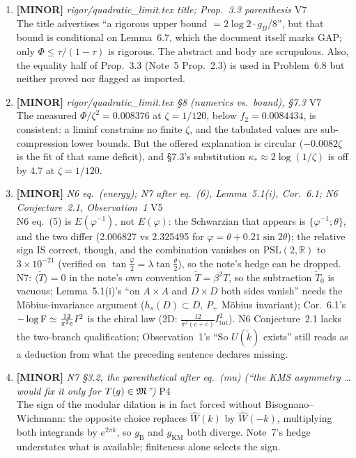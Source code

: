 \documentclass[11pt]{article}
\begin{document}
\begin{enumerate}[leftmargin=1.6em,itemsep=6pt]
\item \textbf{[MINOR]} \emph{rigor/quadratic\_limit.tex title; Prop.~3.3 parenthesis} \hfill\textsc{V7}\\ The title advertises ``a rigorous upper bound \(=2\log2\cdot g_B/8\)'', but that bound is conditional on Lemma~6.7, which the document itself marks GAP; only \(\Phi\le\tau/(1-\tau)\) is rigorous. The abstract and body are scrupulous. Also, the equality half of Prop.~3.3 (Note~5 Prop.~2.3) is used in Problem~6.8 but neither proved nor flagged as imported.
\item \textbf{[MINOR]} \emph{rigor/quadratic\_limit.tex \S8 (numerics vs.\ bound), \S7.3} \hfill\textsc{V7}\\ The measured \(\Phi/\zeta^2=0.008376\) at \(\zeta=1/120\), below \(f_2=0.0084434\), is consistent: a liminf constrains no finite \(\zeta\), and the tabulated values are sub-compression lower bounds. But the offered explanation is circular (\(-0.0082\zeta\) is the fit of that same deficit), and \S7.3's substitution \(\kappa_*\approx2\log(1/\zeta)\) is off by \(4.7\) at \(\zeta=1/120\).
\item \textbf{[MINOR]} \emph{N6 eq.\ (energy); N7 after eq.\ (6), Lemma~5.1(i), Cor.\ 6.1; N6 Conjecture~2.1, Observation~1} \hfill\textsc{V5}\\ N6 eq.\ (5) is \(E(\varphi^{-1})\), not \(E(\varphi)\): the Schwarzian that appears is \(\{\varphi^{-1};\theta\}\), and the two differ (2.006827 vs 2.325495 for \(\varphi=\theta+0.21\sin2\theta\)); the relative sign IS correct, though, and the combination vanishes on \(\mathrm{PSL}(2,\mathbb R)\) to \(3\times10^{-21}\) (verified on \(\tan\frac\varphi2=\lambda\tan\frac\theta2\)), so the note's hedge can be dropped. N7: \(\langle\widetilde T\rangle=0\) in the note's own convention \(\widetilde T=\beta^2T\), so the subtraction \(\widetilde T_0\) is vacuous; Lemma~5.1(i)'s ``on \(A\times A\) and \(D\times D\) both sides vanish'' needs the M\"obius-invariance argument (\(h_s(D)\subset D\), \(P_+\) M\"obius invariant); Cor.\ 6.1's \(-\log\operatorname{F}\simeq\frac{12}{\pi^2c}I^2\) is the chiral law (2D: \(\frac{12}{\pi^2(c+\bar c)}I_{\mathrm{tot}}^2\)). N6 Conjecture~2.1 lacks the two-branch qualification; Observation~1's ``So \(U(\widetilde k)\) exists'' still reads as a deduction from what the preceding sentence declares missing.
\item \textbf{[MINOR]} \emph{N7 \S3.2, the parenthetical after eq.\ (mu) (``the KMS asymmetry \dots would fix it only for \(T(g)\in\mathfrak M\)'')} \hfill\textsc{P4}\\ The sign of the modular dilation is in fact forced without Bisognano--Wichmann: the opposite choice replaces \(\widehat W(k)\) by \(\widehat W(-k)\), multiplying both integrands by \(e^{2\pi k}\), so \(g_{\mathrm B}\) and \(g_{\mathrm{KM}}\) both diverge. Note~7's hedge understates what is available; finiteness alone selects the sign.

\end{enumerate}
\end{document}
